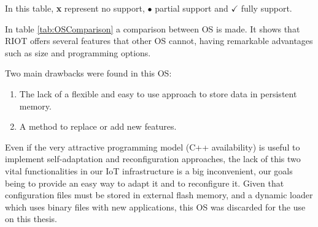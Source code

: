 In this table, \textbf{x} represent no support, $\bullet$ partial support and $\checkmark$ fully support.

In table \ref{tab:OSComparison} a comparison between OS is made.
It shows that RIOT offers several features that other OS cannot, having remarkable advantages such as size and programming options.

Two main drawbacks were found in this OS:
\begin{enumerate}
	\item The lack of a flexible and easy to use approach to store data in persistent memory.
	\item A method to replace or add new features.
\end{enumerate}

Even if the very attractive programming model (C++ availability) is useful to implement self-adaptation and reconfiguration approaches, the lack of this two vital functionalities in our IoT infrastructure is a big inconvenient, our goals being to provide an easy way to adapt it and to reconfigure it.
Given that configuration files must be stored in external flash memory, and a dynamic loader which uses binary files with new applications, this OS was discarded for the use on this thesis.




